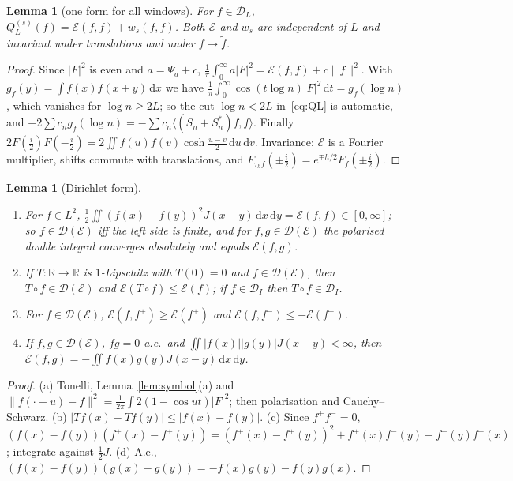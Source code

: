 \documentclass[11pt]{amsart}
\newcommand{\R}{\mathbb{R}}
\newcommand{\cE}{\mathcal{E}}
\newcommand{\dd}{\,\mathrm{d}}
\newtheorem{lemma}[theorem]{Lemma}
\theoremstyle{definition}
\theoremstyle{remark}
\numberwithin{equation}{section}
\begin{document}
\begin{lemma}[one form for all windows]\label{lem:oneform}
For $f\in \mathcal D_L$, $Q^{(s)}_L(f)=\cE(f,f)+w_s(f,f)$. Both $\cE$ and $w_s$ are independent of $L$ and invariant under translations and under $f\mapsto\tilde f$.
\end{lemma}

\begin{proof}
Since $|F|^2$ is even and $a=\Psi_a+c$, $\frac1\pi\int_0^\infty a|F|^2=\cE(f,f)+c\|f\|^2$. With $g_f(y)=\int f(x)f(x+y)\dd x$ we have $\frac1\pi\int_0^\infty\cos(t\log n)|F|^2\dd t=g_f(\log n)$, which vanishes for $\log n\ge2L$; so the cut $\log n<2L$ in~\eqref{eq:QL} is automatic, and $-2\sum c_ng_f(\log n)=-\sum c_n\langle(S_n+S_n^*)f,f\rangle$. Finally $2F(\frac i2)F(-\frac i2)=2\iint f(u)f(v)\cosh\frac{u-v}2\dd u\dd v$. Invariance: $\cE$ is a Fourier multiplier, shifts commute with translations, and $F_{\tau_hf}(\pm\frac i2)=e^{\mp h/2}F_f(\pm\frac i2)$.
\end{proof}

\begin{lemma}[Dirichlet form]\label{lem:DF}
\begin{enumerate}
\item[(a)] For $f\in L^2$, $\frac12\iint(f(x)-f(y))^2J(x-y)\dd x\dd y=\cE(f,f)\in[0,\infty]$; so $f\in \mathcal D(\cE)$ iff the left side is finite, and for $f,g\in \mathcal D(\cE)$ the polarised double integral converges absolutely and equals $\cE(f,g)$.
\item[(b)] If $T:\R\to\R$ is $1$-Lipschitz with $T(0)=0$ and $f\in \mathcal D(\cE)$, then $T\circ f\in \mathcal D(\cE)$ and $\cE(T\circ f)\le\cE(f)$; if $f\in \mathcal D_I$ then $T\circ f\in \mathcal D_I$.
\item[(c)] For $f\in \mathcal D(\cE)$, $\cE(f,f^+)\ge\cE(f^+)$ and $\cE(f,f^-)\le-\cE(f^-)$.
\item[(d)] If $f,g\in \mathcal D(\cE)$, $fg=0$ a.e.\ and $\iint|f(x)||g(y)|J(x-y)<\infty$, then $\cE(f,g)=-\iint f(x)g(y)J(x-y)\dd x\dd y$.
\end{enumerate}
\end{lemma}

\begin{proof}
(a) Tonelli, Lemma~\ref{lem:symbol}(a) and $\|f(\cdot+u)-f\|^2=\frac1{2\pi}\int2(1-\cos ut)|F|^2$; then polarisation and Cauchy--Schwarz. (b) $|Tf(x)-Tf(y)|\le|f(x)-f(y)|$. (c) Since $f^+f^-=0$, $(f(x)-f(y))(f^+(x)-f^+(y))=(f^+(x)-f^+(y))^2+f^+(x)f^-(y)+f^+(y)f^-(x)$; integrate against $\frac12J$. (d) A.e., $(f(x)-f(y))(g(x)-g(y))=-f(x)g(y)-f(y)g(x)$.
\end{proof}
\end{document}
